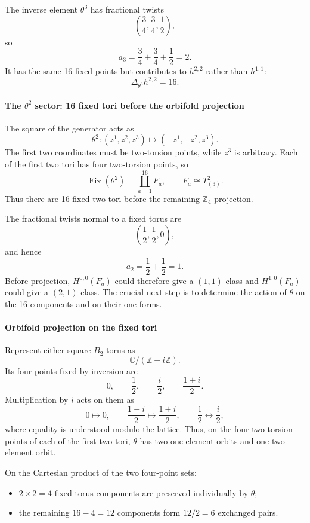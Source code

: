 \documentclass[
  10pt,
  a4paper,
  openany]{book}
\providecommand{\tightlist}{%
  \setlength{\itemsep}{0pt}\setlength{\parskip}{0pt}}
\begin{document}
The inverse element \(\theta^3\) has fractional twists \[
\left(\frac34,\frac34,\frac12\right),
\] so \[
a_3=\frac34+\frac34+\frac12=2.
\] It has the same 16 fixed points but contributes to \(h^{2,2}\) rather
than \(h^{1,1}\): \[
\Delta_{\theta^3}h^{2,2}=16.
\]

\paragraph{\texorpdfstring{The \(\theta^2\) sector: 16 fixed tori before
the orbifold
projection}{The \textbackslash theta\^{}2 sector: 16 fixed tori before the orbifold projection}}\label{the-theta2-sector-16-fixed-tori-before-the-orbifold-projection}

The square of the generator acts as \[
\theta^2:(z^1,z^2,z^3)
\longmapsto
(-z^1,-z^2,z^3).
\] The first two coordinates must be two-torsion points, while \(z^3\)
is arbitrary. Each of the first two tori has four two-torsion points, so
\[
\operatorname{Fix}(\theta^2)
=
\coprod_{a=1}^{16}F_a,
\qquad
F_a\cong T^2_{(3)}.
\] Thus there are 16 fixed two-tori before the remaining \(\mathbb Z_4\)
projection.

The fractional twists normal to a fixed torus are \[
\left(\frac12,\frac12,0\right),
\] and hence \[
a_2=\frac12+\frac12=1.
\] Before projection, \(H^{0,0}(F_a)\) could therefore give a \((1,1)\)
class and \(H^{1,0}(F_a)\) could give a \((2,1)\) class. The crucial
next step is to determine the action of \(\theta\) on the 16 components
and on their one-forms.

\paragraph{Orbifold projection on the fixed
tori}\label{orbifold-projection-on-the-fixed-tori}

Represent either square \(B_2\) torus as \[
\mathbb C/(\mathbb Z+i\mathbb Z).
\] Its four points fixed by inversion are \[
0,
\qquad
\frac12,
\qquad
\frac{i}{2},
\qquad
\frac{1+i}{2}.
\] Multiplication by \(i\) acts on them as \[
0\longmapsto0,
\qquad
\frac{1+i}{2}\longmapsto\frac{1+i}{2},
\qquad
\frac12\longleftrightarrow\frac{i}{2},
\] where equality is understood modulo the lattice. Thus, on the four
two-torsion points of each of the first two tori, \(\theta\) has two
one-element orbits and one two-element orbit.

On the Cartesian product of the two four-point sets:

\begin{itemize}
\tightlist
\item
  \(2\times2=4\) fixed-torus components are preserved individually by
  \(\theta\);
\item
  the remaining \(16-4=12\) components form \(12/2=6\) exchanged pairs.
\end{itemize}
\end{document}
